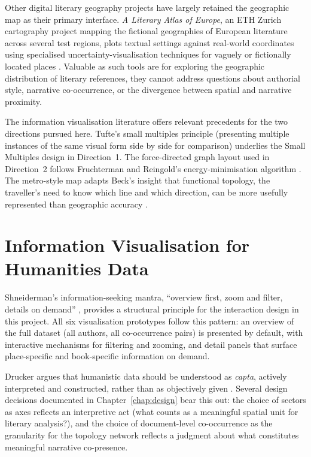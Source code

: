 \documentclass[logo,msc]{infthesis}
\begin{document}
Other digital literary geography projects have largely retained the geographic map as their primary interface. \emph{A Literary Atlas of Europe}, an ETH Zurich cartography project mapping the fictional geographies of European literature across several test regions, plots textual settings against real-world coordinates using specialised uncertainty-visualisation techniques for vaguely or fictionally located places \cite{piatti2009}. Valuable as such tools are for exploring the geographic distribution of literary references, they cannot address questions about authorial style, narrative co-occurrence, or the divergence between spatial and narrative proximity.
 
The information visualisation literature offers relevant precedents for the two directions pursued here. Tufte's small multiples principle \cite{tufte1983} (presenting multiple instances of the same visual form side by side for comparison) underlies the Small Multiples design in Direction~1. The force-directed graph layout used in Direction~2 follows Fruchterman and Reingold's energy-minimisation algorithm \cite{fruchterman1991}. The metro-style map adapts Beck's insight that functional topology, the traveller's need to know which line and which direction, can be more usefully represented than geographic accuracy \cite{beck1933}.
 
\section{Information Visualisation for Humanities Data}
 
Shneiderman's information-seeking mantra, ``overview first, zoom and filter, details on demand'' \cite{shneiderman1996}, provides a structural principle for the interaction design in this project. All six visualisation prototypes follow this pattern: an overview of the full dataset (all authors, all co-occurrence pairs) is presented by default, with interactive mechanisms for filtering and zooming, and detail panels that surface place-specific and book-specific information on demand.
 
Drucker argues that humanistic data should be understood as \emph{capta}, actively interpreted and constructed, rather than as objectively given \cite{drucker2011}. Several design decisions documented in Chapter~\ref{chap:design} bear this out: the choice of sectors as axes reflects an interpretive act (what counts as a meaningful spatial unit for literary analysis?), and the choice of document-level co-occurrence as the granularity for the topology network reflects a judgment about what constitutes meaningful narrative co-presence.
 
\end{document}
